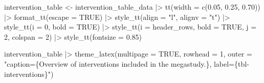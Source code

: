 \documentclass[
  letterpaper,
  DIV=11,
  numbers=noendperiod]{scrartcl}
\newenvironment{Shaded}{\begin{snugshade}}{\end{snugshade}}
\newcommand{\AttributeTok}[1]{\textcolor[rgb]{0.40,0.45,0.13}{#1}}
\newcommand{\ConstantTok}[1]{\textcolor[rgb]{0.56,0.35,0.01}{#1}}
\newcommand{\DecValTok}[1]{\textcolor[rgb]{0.68,0.00,0.00}{#1}}
\newcommand{\FloatTok}[1]{\textcolor[rgb]{0.68,0.00,0.00}{#1}}
\newcommand{\FunctionTok}[1]{\textcolor[rgb]{0.28,0.35,0.67}{#1}}
\newcommand{\NormalTok}[1]{\textcolor[rgb]{0.00,0.23,0.31}{#1}}
\newcommand{\OtherTok}[1]{\textcolor[rgb]{0.00,0.23,0.31}{#1}}
\newcommand{\SpecialCharTok}[1]{\textcolor[rgb]{0.37,0.37,0.37}{#1}}
\newcommand{\StringTok}[1]{\textcolor[rgb]{0.13,0.47,0.30}{#1}}
\begin{document}
\begin{Shaded}
\begin{Highlighting}[]
\NormalTok{intervention\_table }\OtherTok{\textless{}{-}}\NormalTok{ intervention\_table\_data }\SpecialCharTok{|\textgreater{}}
  \FunctionTok{tt}\NormalTok{(}\AttributeTok{width =} \FunctionTok{c}\NormalTok{(}\FloatTok{0.05}\NormalTok{, }\FloatTok{0.25}\NormalTok{, }\FloatTok{0.70}\NormalTok{)) }\SpecialCharTok{|\textgreater{}}
  \FunctionTok{format\_tt}\NormalTok{(}\AttributeTok{escape =} \ConstantTok{TRUE}\NormalTok{) }\SpecialCharTok{|\textgreater{}}
  \FunctionTok{style\_tt}\NormalTok{(}\AttributeTok{align =} \StringTok{"l"}\NormalTok{, }\AttributeTok{alignv =} \StringTok{"t"}\NormalTok{) }\SpecialCharTok{|\textgreater{}}
  \FunctionTok{style\_tt}\NormalTok{(}\AttributeTok{i =} \DecValTok{0}\NormalTok{, }\AttributeTok{bold =} \ConstantTok{TRUE}\NormalTok{) }\SpecialCharTok{|\textgreater{}}
  \FunctionTok{style\_tt}\NormalTok{(}\AttributeTok{i =}\NormalTok{ header\_rows, }\AttributeTok{bold =} \ConstantTok{TRUE}\NormalTok{, }\AttributeTok{j =} \DecValTok{2}\NormalTok{, }\AttributeTok{colspan =} \DecValTok{2}\NormalTok{) }\SpecialCharTok{|\textgreater{}}
  \FunctionTok{style\_tt}\NormalTok{(}\AttributeTok{fontsize =} \FloatTok{0.85}\NormalTok{)}
\end{Highlighting}
\end{Shaded}

\begin{table}

\caption{\label{tbl-interventions}Overview of interventions included in
the megastudy.}

\centering{

\begin{Shaded}
\begin{Highlighting}[]
\NormalTok{intervention\_table}
\end{Highlighting}
\end{Shaded}

}

\end{table}%

\begin{Shaded}
\begin{Highlighting}[]
\NormalTok{intervention\_table }\SpecialCharTok{|\textgreater{}} 
  \FunctionTok{theme\_latex}\NormalTok{(}\AttributeTok{multipage =} \ConstantTok{TRUE}\NormalTok{, }\AttributeTok{rowhead =} \DecValTok{1}\NormalTok{,}
              \AttributeTok{outer =} \StringTok{"caption=\{Overview of interventions included in the megastudy.\}, label=\{tbl{-}interventions\}"}\NormalTok{)}
\end{Highlighting}
\end{Shaded}
\end{document}
